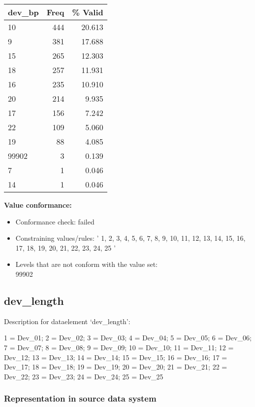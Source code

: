 \documentclass[
]{article}
\providecommand{\tightlist}{%
  \setlength{\itemsep}{0pt}\setlength{\parskip}{0pt}}
\begin{document}
\begin{table}[H]
\centering
\begin{tabular}{l|r|r}
\hline
\textbf{dev\_bp} & \textbf{Freq} & \textbf{\% Valid}\\
\hline
10 & 444 & 20.613\\
\hline
9 & 381 & 17.688\\
\hline
15 & 265 & 12.303\\
\hline
18 & 257 & 11.931\\
\hline
16 & 235 & 10.910\\
\hline
20 & 214 & 9.935\\
\hline
17 & 156 & 7.242\\
\hline
22 & 109 & 5.060\\
\hline
19 & 88 & 4.085\\
\hline
99902 & 3 & 0.139\\
\hline
7 & 1 & 0.046\\
\hline
14 & 1 & 0.046\\
\hline
\end{tabular}
\end{table}

\textbf{Value conformance:}

\begin{itemize}
\tightlist
\item
  Conformance check: failed
\item
  Constraining values/rules: ' 1, 2, 3, 4, 5, 6, 7, 8, 9, 10, 11, 12,
  13, 14, 15, 16, 17, 18, 19, 20, 21, 22, 23, 24, 25 '
\item
  Levels that are not conform with the value set:\\
  99902
\end{itemize}

\newpage

\hypertarget{dev_length}{%
\subsection{dev\_length}\label{dev_length}}

Description for dataelement `dev\_length':

1 = Dev\_01; 2 = Dev\_02; 3 = Dev\_03; 4 = Dev\_04; 5 = Dev\_05; 6 =
Dev\_06; 7 = Dev\_07; 8 = Dev\_08; 9 = Dev\_09; 10 = Dev\_10; 11 =
Dev\_11; 12 = Dev\_12; 13 = Dev\_13; 14 = Dev\_14; 15 = Dev\_15; 16 =
Dev\_16; 17 = Dev\_17; 18 = Dev\_18; 19 = Dev\_19; 20 = Dev\_20; 21 =
Dev\_21; 22 = Dev\_22; 23 = Dev\_23; 24 = Dev\_24; 25 = Dev\_25

\hypertarget{representation-in-source-data-system-6}{%
\subsubsection{\texorpdfstring{Representation in \textbf{source} data
system}{Representation in source data system}}\label{representation-in-source-data-system-6}}
\end{document}
